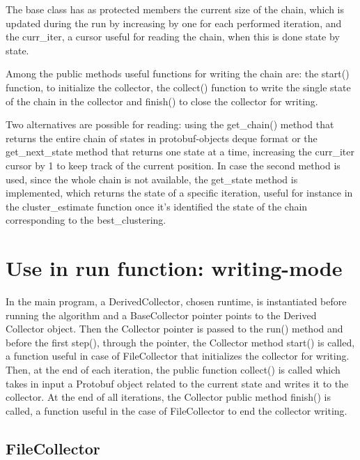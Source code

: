 The base class has as protected members the current size of the chain, which is updated during the run by increasing by one for each performed  iteration, and the curr\_iter, a cursor useful for reading the chain, when this is done state by state.

Among the public methods useful functions for writing the chain are: the start() function, to initialize the collector, the collect() function to write the single state of the chain in the collector and finish() to close the collector for writing. 

Two alternatives are possible for reading: using the get\_chain() method that returns the entire chain of states in protobuf-objects deque format or the get\_next\_state method that returns one state at a time, increasing the curr\_iter cursor by 1 to keep track of the current position. In case the second method is used, since the whole chain is not available, the get\_state method is implemented, which returns the state of a specific iteration, useful for instance in the cluster\_estimate function once it’s  identified the state of the chain corresponding to the best\_clustering.

\section{Use in run function: writing-mode}
In the main program, a DerivedCollector, chosen runtime, is instantiated before running the algorithm and a BaseCollector pointer points to the Derived Collector object.
Then the Collector pointer is passed to the run() method and before the first step(), through the pointer, the Collector method start() is called, a function useful in case of FileCollector that initializes the collector for writing. Then, at the end of each iteration, the public function collect() is called which takes in input a Protobuf object related to the current state and writes it to the collector. At the end of all iterations, the Collector public method finish() is called, a function useful in the case of FileCollector to end the collector writing.


\subsection{FileCollector}

